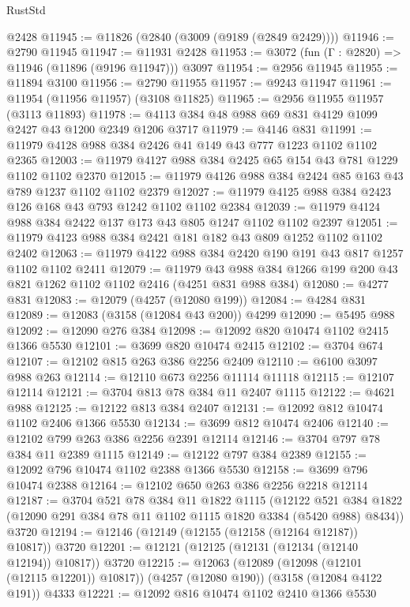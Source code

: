 \begin{lexlean}{RustStd}
\begin{coremodule}
    @2428
@11945 := @11826 (@2840 (@3009 (@9189 (@2849 @2429))))
@11946 := @2790 @11945
@11947 := @11931 @2428
@11953 := @3072 (fun (Γ : @2820) => @11946 (@11896 (@9196 @11947))) @3097
@11954 := @2956 @11945
@11955 := @11894 @3100
@11956 := @2790 @11955
@11957 := @9243 @11947
@11961 := @11954 (@11956 @11957) (@3108 @11825)
@11965 := @2956 @11955 @11957 (@3113 @11893)
@11978 := @4113 @384 @48 @988 @69 @831 @4129 @1099 @2427 @43 @1200 @2349 @1206 @3717
@11979 := @4146 @831
@11991 := @11979 @4128 @988 @384 @2426 @41 @149 @43 @777 @1223 @1102 @1102 @2365
@12003 := @11979 @4127 @988 @384 @2425 @65 @154 @43 @781 @1229 @1102 @1102 @2370
@12015 := @11979 @4126 @988 @384 @2424 @85 @163 @43 @789 @1237 @1102 @1102 @2379
@12027 := @11979 @4125 @988 @384 @2423 @126 @168 @43 @793 @1242 @1102 @1102 @2384
@12039 := @11979 @4124 @988 @384 @2422 @137 @173 @43 @805 @1247 @1102 @1102 @2397
@12051 := @11979 @4123 @988 @384 @2421 @181 @182 @43 @809 @1252 @1102 @1102 @2402
@12063 := @11979 @4122 @988 @384 @2420 @190 @191 @43 @817 @1257 @1102 @1102 @2411
@12079 := @11979
    @43
    @988
    @384
    @1266
    @199
    @200
    @43
    @821
    @1262
    @1102
    @1102
    @2416
    (@4251 @831 @988 @384)
@12080 := @4277 @831
@12083 := @12079 (@4257 (@12080 @199))
@12084 := @4284 @831
@12089 := @12083 (@3158 (@12084 @43 @200)) @4299
@12090 := @5495 @988
@12092 := @12090 @276 @384
@12098 := @12092 @820 @10474 @1102 @2415 @1366 @5530
@12101 := @3699 @820 @10474 @2415
@12102 := @3704 @674
@12107 := @12102 @815 @263 @386 @2256 @2409
@12110 := @6100 @3097 @988 @263
@12114 := @12110 @673 @2256 @11114 @11118
@12115 := @12107 @12114
@12121 := @3704 @813 @78 @384 @11 @2407 @1115
@12122 := @4621 @988
@12125 := @12122 @813 @384 @2407
@12131 := @12092 @812 @10474 @1102 @2406 @1366 @5530
@12134 := @3699 @812 @10474 @2406
@12140 := @12102 @799 @263 @386 @2256 @2391 @12114
@12146 := @3704 @797 @78 @384 @11 @2389 @1115
@12149 := @12122 @797 @384 @2389
@12155 := @12092 @796 @10474 @1102 @2388 @1366 @5530
@12158 := @3699 @796 @10474 @2388
@12164 := @12102 @650 @263 @386 @2256 @2218 @12114
@12187 := @3704
    @521
    @78
    @384
    @11
    @1822
    @1115
    (@12122 @521 @384 @1822 (@12090 @291 @384 @78 @11 @1102 @1115 @1820 @3384 (@5420 @988) @8434))
    @3720
@12194 := @12146 (@12149 (@12155 (@12158 (@12164 @12187)) @10817)) @3720
@12201 := @12121 (@12125 (@12131 (@12134 (@12140 @12194)) @10817)) @3720
@12215 := @12063
    (@12089 (@12098 (@12101 (@12115 @12201)) @10817))
    (@4257 (@12080 @190))
    (@3158 (@12084 @4122 @191))
    @4333
@12221 := @12092 @816 @10474 @1102 @2410 @1366 @5530

\end{coremodule}
\end{lexlean}
